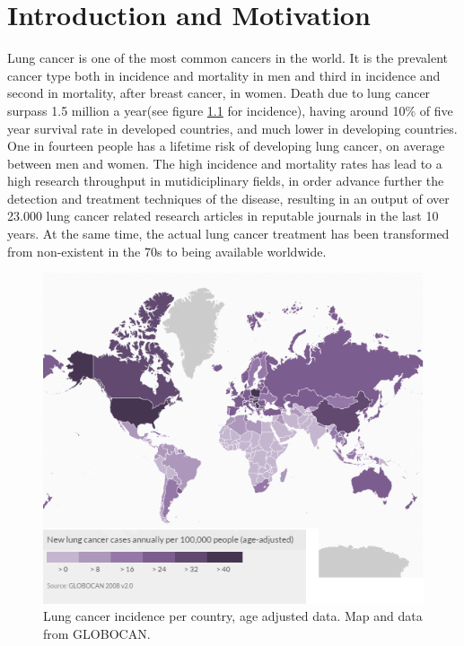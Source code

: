 \chapter{Introduction and Motivation}\label{ch:intro}


Lung cancer is one of the most common {cancers} in the world. It is the prevalent cancer type both in incidence and mortality in men and third in incidence and second in mortality, after breast cancer, in women\cite{WCR2014}. Death due to lung cancer surpass 1.5 million a year(see figure \ref{fig:world} for incidence), having around 10\% of five year survival rate in developed countries, and much lower in developing countries\cite{CRUK2014}. One in fourteen people has a lifetime risk of developing lung cancer\cite{Harrisons2012}, on average between men and women. The high incidence and mortality rates has lead to a high research throughput in mutidiciplinary fields, in order advance further the detection and treatment techniques of the disease, resulting in an output of over 23.000 lung cancer related research articles in reputable journals in the last 10 years\cite{Nature2015}. At the same time, the  actual lung cancer treatment has been transformed from non-existent in the 70s to being available worldwide\cite{Comis2003}.


\begin{figure}[ht]
\begin{center}
\includegraphics[width=0.65\columnwidth]{StateOfArt/worldmap.png}
\caption[Lung cancer incidence in the world]{Lung cancer incidence per country, age adjusted data. Map and data from {GLOBOCAN}\cite{GLOBOCAN2010}.}
\label{fig:world}
\end{center}
\end{figure}

